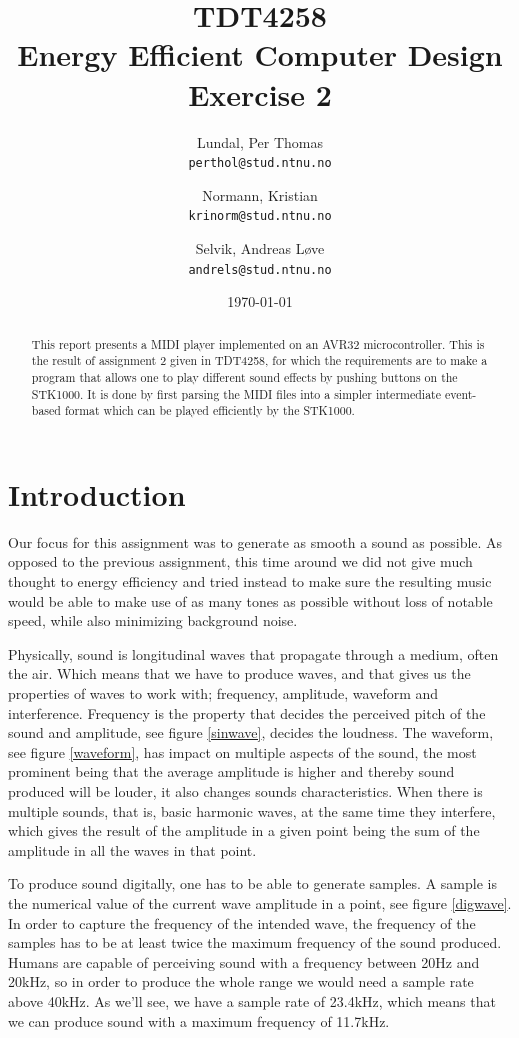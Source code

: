 \documentclass[a4paper,12pt]{article}
\title{TDT4258 \\ Energy Efficient Computer Design \\ Exercise 2}
\author{
    Lundal, Per Thomas \\ \texttt{perthol@stud.ntnu.no}
    \and
    Normann, Kristian \\ \texttt{krinorm@stud.ntnu.no}
    \and
    Selvik, Andreas Løve \\ \texttt{andrels@stud.ntnu.no}
}
\date{\today}
\begin{document}
\maketitle
\clearpage
\begin{abstract}

This report presents a MIDI player implemented on an AVR32 microcontroller. This is the result of assignment 2 given in TDT4258, for which the requirements are to make a program that allows one to play different sound effects by pushing buttons on the STK1000. It is done by first parsing the MIDI files into a simpler intermediate event-based format which can be played efficiently by the STK1000.

\end{abstract}

\clearpage
\tableofcontents

\clearpage
\section{Introduction}
Our focus for this assignment was to generate as smooth a sound as possible. As opposed to the previous assignment, this time around we did not give much thought to energy efficiency and tried instead to make sure the resulting music would be able to make use of as many tones as possible without loss of notable speed, while also minimizing background noise.

Physically, sound is longitudinal waves that propagate through a medium, often the air. Which means that we have to produce waves, and that gives us the properties of waves to work with; frequency, amplitude, waveform and interference. Frequency is the property that decides the perceived pitch of the sound and amplitude, see figure \ref{sinwave}, decides the loudness. The waveform, see figure \ref{waveform}, has impact on multiple aspects of the sound, the most prominent being that the average amplitude is higher and thereby sound produced will be louder, it also changes sounds characteristics. When there is multiple sounds, that is, basic harmonic waves, at the same time they interfere, which gives the result of the amplitude in a given point being the sum of the amplitude in all the waves in that point. 

To produce sound digitally, one has to be able to generate samples. A sample is the numerical value of the current wave amplitude in a point, see figure \ref{digwave}. In order to capture the frequency of the intended wave, the frequency of the samples has to be at least twice the maximum frequency of the sound produced. Humans are capable of perceiving sound with a frequency between 20Hz and 20kHz, so in order to produce the whole range we would need a sample rate above 40kHz. As we’ll see, we have a sample rate of 23.4kHz, which means that we can produce sound with a maximum frequency of 11.7kHz. 
\end{document}
